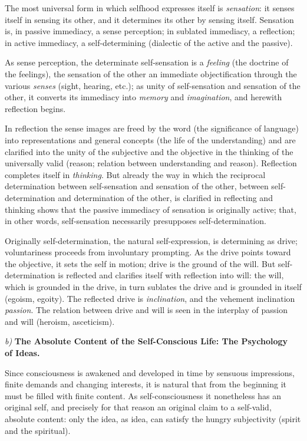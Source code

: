 \documentclass[12pt,a4paper,openany]{book}
\newcommand{\opage}[1]{\marginnote{\footnotesize\textit{[#1]}}}
\begin{document}
The most universal form in which selfhood expresses itself is \emph{sensation}: it senses itself in sensing its other,
and it determines its other by sensing itself. Sensation is, in passive immediacy, a sense perception; in sublated
immediacy, a reflection; in active immediacy, a self-determining (dialectic of the active and the passive).

As sense perception, the determinate self-sensation is a \emph{feeling} (the doctrine of the feelings), the sensation
of the other an immediate objectification through the various \emph{senses} (sight, hearing, etc.); as unity of
self-sensation and sensation of the other, it converts its immediacy into
\opage{7}\emph{memory} and \emph{imagination}, and herewith reflection begins.

In reflection the sense images are freed by the word (the significance of language) into representations and general
concepts (the life of the understanding) and are clarified into the unity of the subjective and the objective in the
thinking of the universally valid (reason; relation between understanding and reason). Reflection completes itself in
\emph{thinking}. But already the way in which the reciprocal determination between self-sensation and sensation of the
other, between self-determination and determination of the other, is clarified in reflecting and thinking shows that
the passive immediacy of sensation is originally active; that, in other words, self-sensation necessarily presupposes
self-determination.

Originally self-determination, the natural self-expression, is determining as drive; voluntariness proceeds from
involuntary prompting. As the drive points toward the objective, it sets the self in motion; drive is the ground of the
will. But self-determination is reflected and clarifies itself with reflection into will: the will, which is grounded in
the drive, in turn sublates the drive and is grounded in itself (egoism, egoity). The reflected drive is
\emph{inclination}, and the vehement inclination \emph{passion}. The relation between drive and will is seen in the
interplay of passion and will (heroism, asceticism).

\begin{center}
\textit{b)} \textbf{The Absolute Content of the Self-Conscious Life: The Psychology}\\
\textbf{of Ideas.}
\end{center}

Since consciousness is awakened and developed in time by sensuous impressions, finite demands and changing interests,
it is natural that from the beginning it must be filled with finite content. As self-consciousness it nonetheless has an
original self, and precisely for that reason an original claim to a self-valid, absolute content: only the idea, as
idea, can satisfy the hungry subjectivity (spirit and the spiritual).
\end{document}
